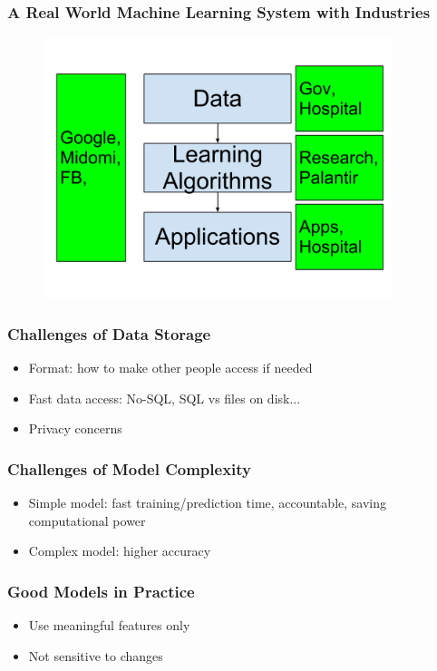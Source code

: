 \documentclass{beamer}
\begin{document}
\begin{frame}
  \frametitle{A Real World Machine Learning System with Industries}
  \begin{figure}
  \includegraphics[width=4in]{Framework_Indus.png}\\
  \end{figure}
\end{frame}


\begin{frame}
  \frametitle{Challenges of Data Storage}
  \begin{itemize}
  \item Format: how to make other people access if needed 
  \item Fast data access: No-SQL, SQL vs files on disk...
  \item Privacy concerns
  \end{itemize}
\end{frame}

\begin{frame}
  \frametitle{Challenges of Model Complexity}
  \begin{itemize}
  \item Simple model: fast training/prediction time, accountable, saving computational power 
  \item Complex model: higher accuracy
  \end{itemize}
\end{frame}

\begin{frame}
  \frametitle{Good Models in Practice}
  \begin{itemize}
  \item Use meaningful features only
  \item Not sensitive to changes
  \end{itemize}
\end{frame}
\end{document}
